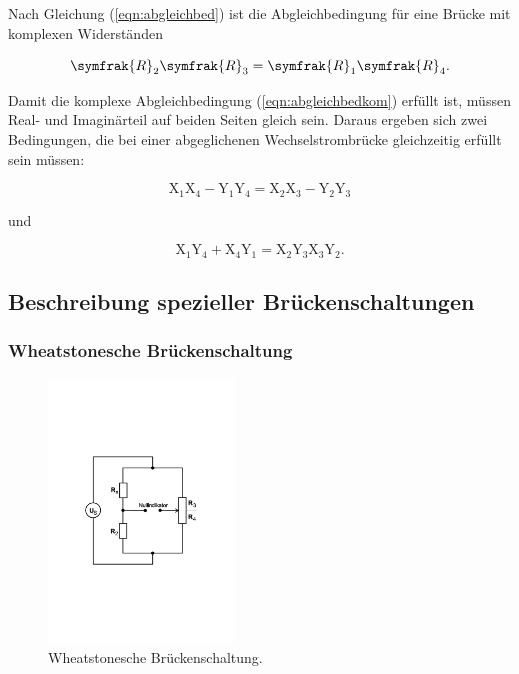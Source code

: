 \noindent
Nach Gleichung (\ref{eqn:abgleichbed}) ist die Abgleichbedingung für eine Brücke mit komplexen Widerständen 

\begin{equation}
\symfrak{R}_2 \symfrak{R}_3 = \symfrak{R}_1 \symfrak{R}_4 .
\label{eqn:abgleichbedkom}
\end{equation}

\noindent
Damit die komplexe Abgleichbedingung (\ref{eqn:abgleichbedkom}) erfüllt ist, müssen Real- und Imaginärteil auf beiden Seiten gleich sein.
Daraus ergeben sich zwei Bedingungen, die bei einer abgeglichenen Wechselstrombrücke gleichzeitig erfüllt sein müssen:

\begin{equation}
\text{X}_1 \text{X}_4 - \text{Y}_1 \text{Y}_4 = \text{X}_2 \text{X}_3 - \text{Y}_2 \text{Y}_3
\label{eqn:abgleichbed1}
\end{equation}

\noindent
und 

\begin{equation}
\text{X}_1 \text{Y}_4 + \text{X}_4 \text{Y}_1 = \text{X}_2 \text{Y}_3 \text{X}_3 \text{Y}_2  .
\label{eqn:abgleichbed2}
\end{equation}

\newpage
\subsection{Beschreibung spezieller Brückenschaltungen}

\subsubsection{Wheatstonesche Brückenschaltung}

\begin{figure}
            \centering
               \includegraphics[height=7cm]{wheatstone.pdf}
               \caption{Wheatstonesche Brückenschaltung.}
               \label{fig:wheat}
        \end{figure}

